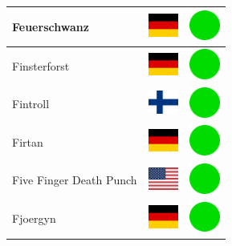 \documentclass[12pt, a4paper, twoside]{report}
\begin{document}
\begin{center}
\begin{longtable}{|p{5cm}|p{2cm}|p{2cm}|}
 Feuerschwanz                                               & \includegraphics[width=1cm]{../4x3/de} &   \includegraphics[width=1cm]{../likes/y} \\ \hline
 Finsterforst                                               & \includegraphics[width=1cm]{../4x3/de} &   \includegraphics[width=1cm]{../likes/y} \\ \hline
 Fintroll                                                   & \includegraphics[width=1cm]{../4x3/fi} &   \includegraphics[width=1cm]{../likes/y} \\ \hline
 Firtan                                                     & \includegraphics[width=1cm]{../4x3/de} &   \includegraphics[width=1cm]{../likes/y} \\ \hline
 Five Finger Death Punch                                    & \includegraphics[width=1cm]{../4x3/us} &   \includegraphics[width=1cm]{../likes/y} \\ \hline
 Fjoergyn                                                   & \includegraphics[width=1cm]{../4x3/de} &   \includegraphics[width=1cm]{../likes/y} \\ \hline

\end{longtable}
\end{center}
\end{document}
